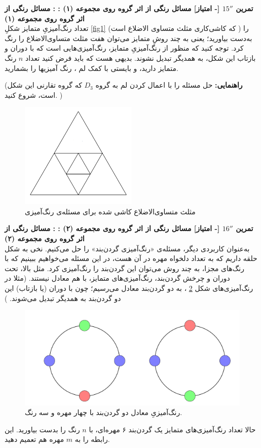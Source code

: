 \documentclass{article}
\newenvironment{exercise}[3][\unskip]{%
	\par
	\noindent
	\textbf{تمرین
		#1
		[- امتیاز] 
		\def\temp{#3}\ifx\temp\empty
		: 
		\else
		: #3 \vspace{0.5em} \\ \noindent
		\fi
}}{}
\begin{document}
	\begin{exercise}[$15''$]{20}{مسائل رنگی از اثر گروه روی مجموعه (۱)}
		تعداد رنگ‌آمیزیِ متمایز شکلِ
		\eqref{fig1}
		را 
		( که کاشی‌کاری مثلث متساوی الاضلاع است) به‌دست بیاورید؛ یعنی به چند روشِ متمایز می‌توان هفت مثلث متساوی‌الاضلاع را رنگ کرد. توجه کنید که منظور از رنگ‌آمیزی‌ِ متمایز، رنگ‌آمیزی‌هایی است که با دوران و بازتاب این شکل، به همدیگر تبدیل نشوند. بدیهی هست که باید فرض کنید تعداد
		$n$ رنگ متمایز دارید، و بایستی با کمک لم
		، رنگ آمیزیها را بشمارید.
		
		\noindent
		(\textbf{راهنمایی:}
		حل مسئله را با اعمال کردن لم 
		به گروه $D_3$ که گروه تقارنی این شکل است، شروع کنید.
		)
		
		\begin{figure}[h]
			\centering
			\includegraphics[width=15em]{Pics/1.png}
			\caption{مثلث متساوی‌الاضلاع کاشی شده برای مسئله‌ی رنگ‌آمیزی}
			\label{fig1}
		\end{figure}
		
	\end{exercise}
	\begin{exercise}[$16''$]{20}{مسائل رنگی از اثر گروه روی مجموعه (۲)}
		به‌عنوان کاربردی دیگر، مسئله‌ی «رنگ‌آمیزی گردن‌بند» را حل می‌کنیم. نخی به شکل حلقه داریم که به تعداد دلخواه مهره در آن هست، در این مسئله می‌خواهیم ببینیم که با رنگ‌های مجزا، به چند روش می‌توان این گردن‌بند را رنگ‌آمیزی کرد. مثل بالا، تحت دوران و چرخش گردن‌بند، رنگ‌آمیزی‌های متمایز، با هم معادل نیستند. (مثلا در رنگ‌آمیزی‌های شکل 
		\ref{pic2}
		، 
		به دو گردن‌بند معادل می‌رسیم؛ چون با دوران (یا بازتاب) این دو گردن‌بند به همدیگر تبدیل می‌شوند.
		)
		
		\begin{figure}[h]
			\centering
			\includegraphics[width=32em]{Pics/2.png}
			\caption{رنگ‌آمیزیِ معادل دو گردن‌بند با چهار مهره و سه رنگ.}
			\label{pic2}
		\end{figure}
		
		حالا تعداد رنگ‌آمیزی‌های متمایز یک گردن‌بند ۶ مهره‌ای، با $n$ رنگ را بدست بیاورید. این رابطه را به $m$ مهره هم تعمیم دهید.
	\end{exercise}
\end{document}

